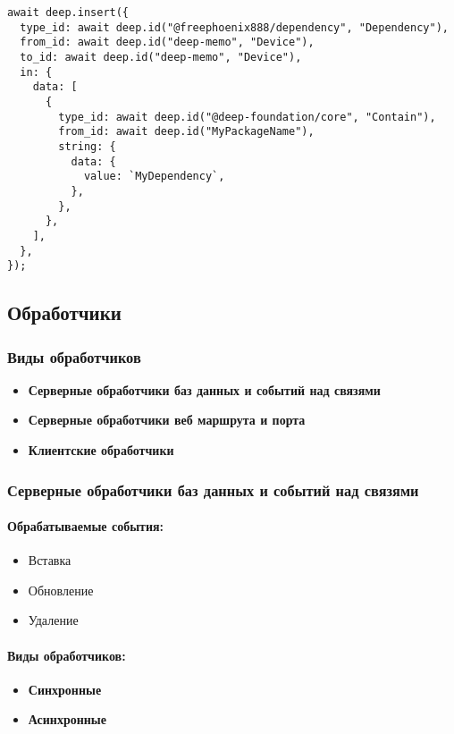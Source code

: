 \documentclass{article}
\begin{document}
\begin{lstlisting}
await deep.insert({
  type_id: await deep.id("@freephoenix888/dependency", "Dependency"),
  from_id: await deep.id("deep-memo", "Device"),
  to_id: await deep.id("deep-memo", "Device"),
  in: {
    data: [
      {
        type_id: await deep.id("@deep-foundation/core", "Contain"),
        from_id: await deep.id("MyPackageName"),
        string: {
          data: {
            value: `MyDependency`,
          },
        },
      },
    ],
  },
});
\end{lstlisting}

\subsection{Обработчики}

\subsubsection{Виды обработчиков}
\begin{itemize}
  \item \textbf{Серверные обработчики баз данных и событий над связями}
  \item \textbf{Серверные обработчики веб маршрута и порта}
  \item \textbf{Клиентские обработчики}
\end{itemize}

\subsubsection{Серверные обработчики баз данных и событий над связями}
\paragraph{Обрабатываемые события:}
\begin{itemize}
  \item Вставка
  \item Обновление
  \item Удаление
\end{itemize}
\paragraph{Виды обработчиков:}
\begin{itemize}
  \item \textbf{Синхронные}
  \item \textbf{Асинхронные}
\end{itemize}
\end{document}
